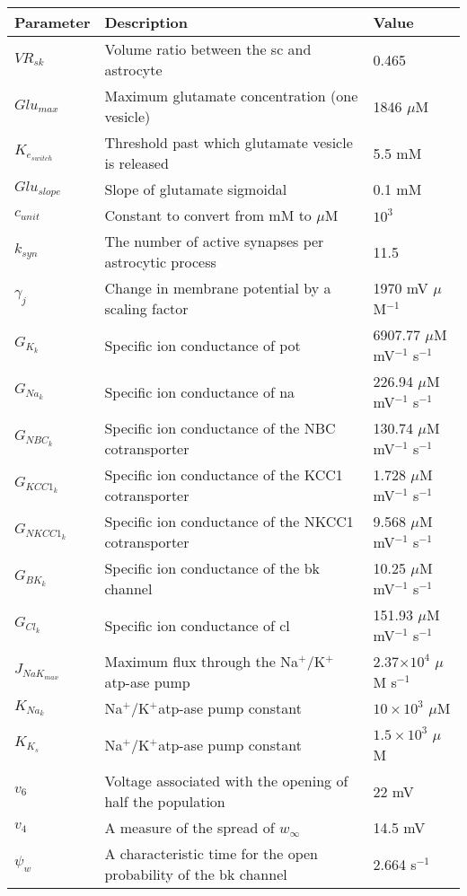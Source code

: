 \documentclass[11pt]{elsarticle}
\newcommand{\sodpot}{Na$^+$/K$^+$\xspace}
\newcommand{\mus}{$\mu$M s$^{-1}$\xspace}
\newcommand{\uM}{$\mu$M\xspace}
\newcommand{\n}{$^{-1}$\xspace}
\newcommand{\e}[1]{\times 10^{#1}}
\newcommand{\psec}{s$^{-1}$\xspace}
\newcommand{\na}{\gls{na}\xspace}
\newcommand{\pot}{\gls{pot}\xspace}
\newcommand{\cl}{\gls{cl}\xspace}
\begin{document}
\begin{longtable}[h!]{ p{0.1\linewidth}   p{0.68\linewidth}   p{0.22\linewidth} }
	\hline
	Parameter & Description & Value \\
	\hline
$VR_{sk}$ 			& Volume ratio between the \gls{sc} and astrocyte & 0.465 \\
$Glu_{max}$ 		& Maximum glutamate concentration (one vesicle) 		& 1846 $\mu$M   \\
$K_{e_{switch}}$	& Threshold past which glutamate vesicle is released		& 5.5 mM \\
$Glu_{slope}$		& Slope of glutamate sigmoidal				& 0.1 mM	 \\
$c_{unit}$			& Constant to convert from mM to \uM & $10^3$ \\
$k_{syn}$			& The number of active synapses per astrocytic process					& 11.5		 \\
$\gamma_j$				& Change in membrane potential by a scaling factor					& 1970 mV \uM\n \\
$G_{K_{k}}$ 	& Specific ion conductance of \pot 			& 6907.77 $\mu$M mV\n \psec  \\
$G_{Na_k}$ 		& Specific ion conductance of \na 		& 226.94  $\mu$M mV\n \psec   \\
$G_{NBC_k}$ 	& Specific ion conductance of the NBC cotransporter			& 130.74 $\mu$M mV\n \psec  \\
$G_{KCC1_k}$ 	& Specific ion conductance of the KCC1 cotransporter					& 1.728  $\mu$M mV\n \psec  \\
$G_{NKCC1_k}$ 	& Specific ion conductance of the NKCC1 cotransporter	 				& 9.568 $\mu$M mV\n \psec \\
$G_{BK_k}$ 		& Specific ion conductance of the \gls{bk} channel		& 10.25 $\mu$M mV\n \psec  \\
$G_{Cl_k}$ 		& Specific ion conductance of \cl 		&   151.93  $\mu$M mV\n \psec \\
$J_{NaK_{max}}$ & Maximum flux through the \sodpot \gls{atp}-ase pump							& 2.37$\e{4}$ \mus  \\
$K_{Na_k}$ & \sodpot \gls{atp}-ase pump constant							& $10\e{3}$ \uM  \\
$K_{K_s}$ & \sodpot \gls{atp}-ase pump constant							& $1.5\e{3}$ \uM  \\
$v_{6}$			& Voltage associated with the opening of half the population		& 22 mV  \\
$v_{4}$			& A measure of the spread of $w_{\infty}$	& 14.5 mV \\
$ \psi_{w}$    	& A characteristic time for the open probability of the \gls{bk} channel		& 2.664 \psec  \\

\end{longtable}
\end{document}
